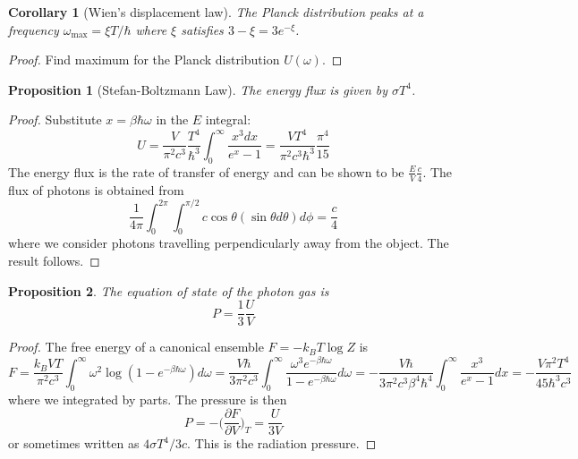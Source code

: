 \documentclass[a4paper]{article}
\theoremstyle{new}
\newtheorem{prop}{Proposition}[section]
\newtheorem{cor}{Corollary}[section]
\begin{document}
\begin{cor}[Wien's displacement law]
The Planck distribution peaks at a frequency $\omega_{\text{max}}=\xi T/\hbar$ where $\xi$ satisfies $3-\xi=3e^{-\xi}$.
\end{cor}
\begin{proof}
Find maximum for the Planck distribution $U(\omega)$.
\end{proof}
\begin{prop}[Stefan-Boltzmann Law]
The energy flux is given by $\sigma T^4$.
\end{prop}
\begin{proof}
Substitute $x=\beta\hbar\omega$ in the $E$ integral:
$$U=\frac{V}{\pi^2c^3}\frac{T^4}{\hbar^3}\int_0^\infty\frac{x^3dx}{e^x-1}=\frac{VT^4}{\pi^2c^3\hbar^3}\frac{\pi^4}{15}$$
The energy flux is the rate of transfer of energy and can be shown to be $\frac{E}{V}\frac{c}{4}$. The flux of photons is obtained from
$$\frac{1}{4\pi}\int_0^{2\pi}\int_0^{\pi/2}c\cos\theta (\sin\theta d\theta) d\phi=\frac{c}{4}$$
where we consider photons travelling perpendicularly away from the object. The result follows.
\end{proof}
\begin{prop}
The equation of state of the photon gas is
\begin{equation}
P=\frac{1}{3}\frac{U}{V}\label{photonpressure}
\end{equation}
\end{prop}
\begin{proof}
The free energy of a canonical ensemble $F=-k_BT\log Z$ is
$$F=\frac{k_BVT}{\pi^2c^3}\int_0^\infty\omega^2\log(1-e^{-\beta\hbar\omega})d\omega=\frac{V\hbar}{3\pi^2c^3}\int_0^\infty\frac{\omega^3e^{-\beta\hbar\omega}}{1-e^{-\beta\hbar\omega}}d\omega=-\frac{V\hbar}{3\pi^2c^3\beta^4\hbar^4}\int_0^\infty\frac{x^3}{e^x-1}dx=-\frac{V\pi^2T^4}{45\hbar^3c^3}$$
where we integrated by parts. The pressure is then
$$P=-\bigg(\frac{\partial F}{\partial V}\bigg)_T=\frac{U}{3V}$$
or sometimes written as $4\sigma T^4/3c$. This is the radiation pressure. 
\end{proof}
\end{document}
